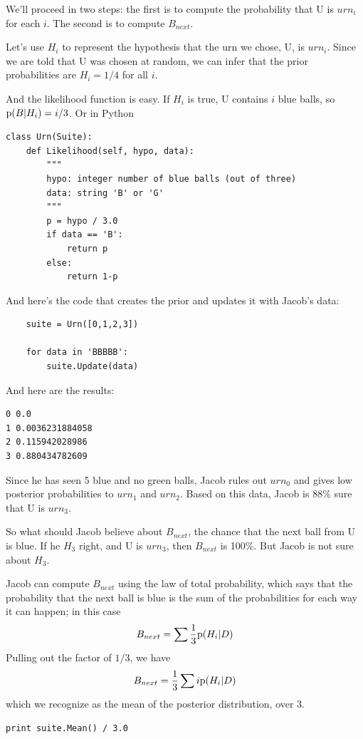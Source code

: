 \documentclass[12pt]{book}
\begin{document}
We'll proceed in two steps: the first is to compute the probability
that U is $urn_i$ for each $i$.  The second is to compute $B_{next}$.

Let's use $H_i$ to represent the hypothesis that the urn we chose, U,
is $urn_i$.  Since we are told that U was chosen at random, we can
infer that the prior probabilities are $H_i = 1/4$ for all $i$.

And the likelihood function is easy.  If $H_i$ is true, U contains
$i$ blue balls, so $\mathrm{p}(B|H_i) = i/3$.  Or in Python

\begin{verbatim}
class Urn(Suite):
    def Likelihood(self, hypo, data):
        """
        hypo: integer number of blue balls (out of three)
        data: string 'B' or 'G'
        """
        p = hypo / 3.0
        if data == 'B':
            return p
        else:
            return 1-p
\end{verbatim}

And here's the code that creates the prior and updates it
with Jacob's data:

\begin{verbatim}
    suite = Urn([0,1,2,3])

    for data in 'BBBBB':
        suite.Update(data)
\end{verbatim}

And here are the results:

\begin{verbatim}
0 0.0
1 0.0036231884058
2 0.115942028986
3 0.880434782609
\end{verbatim}

Since he has seen 5 blue and no green balls, Jacob rules out $urn_0$
and gives low posterior probabilities to $urn_1$ and $urn_2$.  Based
on this data, Jacob is 88\% sure that U is $urn_3$.

So what should Jacob believe about $B_{next}$, the chance that the
next ball from U is blue.  If he $H_3$ right, and U is $urn_3$,
then $B_{next}$ is 100\%.  But Jacob is not sure about $H_3$.

Jacob can compute $B_{next}$ using the law of total probability, which
says that the probability that the next ball is blue is the sum
of the probabilities for each way it can happen; in this case
%
\[ B_{next} = \sum \frac{1}{3} \mathrm{p}(H_i | D) \]
%
Pulling out the factor of $1/3$, we have
%
\[ B_{next} = \frac{1}{3} \sum i \mathrm{p}(H_i | D) \]
%
which we recognize as the mean of the posterior distribution, over 3.

\begin{verbatim}
print suite.Mean() / 3.0
\end{verbatim}
\end{document}
